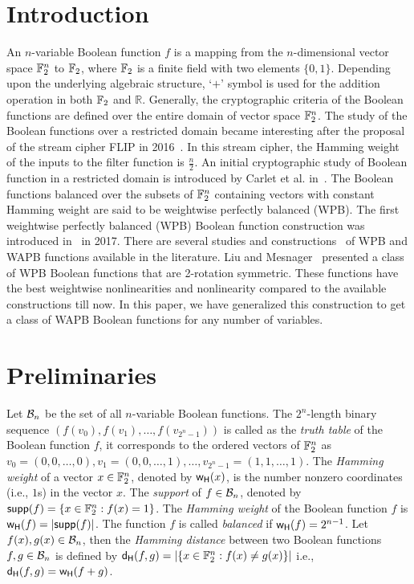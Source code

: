 \documentclass{llncs}
\begin{document}
\section{Introduction}
An $n$-variable Boolean function $f$ is a mapping from the $n$-dimensional vector space $\mathbb{F}_2^n$ to $\mathbb{F}_2$, where $\mathbb{F}_2$ is a finite field with two elements $\{0,1\}$. Depending upon the underlying algebraic structure, `$+$' symbol is used for the addition operation in both $\mathbb{F}_2$ and $\mathbb{R}$. 
Generally, the cryptographic criteria of the Boolean functions are defined over the entire domain of vector space $\mathbb{F}_2^n$. The study of the Boolean functions over a restricted domain became interesting after the proposal of the stream cipher FLIP in 2016~\cite{EC:MJSC16}. 
In this stream cipher, the Hamming weight of the inputs to the filter function is  $\frac{n}{2}$.  
An initial cryptographic study of Boolean function in a restricted domain is introduced by Carlet et al. in~\cite{TOSC:CarMeaRot17}.    
The Boolean functions balanced over the subsets of $\mathbb{F}_2^n$ containing vectors with constant Hamming weight are said to be weightwise perfectly balanced (WPB). The first weightwise perfectly balanced (WPB) Boolean function construction was introduced in~\cite{TOSC:CarMeaRot17} in 2017.  There are several studies and constructions~\cite{CC:TangLiu19,DCC:LiuMes19,DAM:LiSu20,CC:MesSu21,DAM:Su21,DAM:ZhuSu22,DAM:GinMea22,INDO:GinMea22,Latin:GinMea23,DAM:ZLCQZ23,AMC:DM24} of WPB and WAPB functions available in the literature.
Liu and Mesnager~\cite{DCC:LiuMes19} presented a class of WPB Boolean functions that are 2-rotation symmetric. These functions have the best weightwise nonlinearities and nonlinearity compared to the available constructions till now. In this paper, we have generalized this construction to get a class of WAPB Boolean functions for any number of variables.
\section{Preliminaries}
Let $\mathcal{B}_n$ be the set of all $n$-variable Boolean functions. 
The $2^n$-length binary sequence $(f(v_0), f(v_1), \ldots, f(v_{2^n-1}))$ is called as the {\em truth table} of the Boolean function $f$, it corresponds to the ordered vectors of $\mathbb{F}_2^n$ as $v_0 = (0,0,\ldots,0), v_1= (0,0,\ldots,1),\ldots, v_{2^n-1}=(1,1,\ldots,1)$. 
The {\em Hamming weight} of a vector $x \in \mathbb{F}_2^n$, denoted by $\mathsf{w_H}(x)$, is the number nonzero coordinates (i.e., $1$s) in the vector $x$. The {\em support} of $f \in \mathcal{B}_n$, denoted by $\mathsf{supp}(f)= \{x \in \mathbb{F}_2^n : f(x) = 1\}$. The {\em Hamming weight} of the Boolean function $f$ is $\mathsf{w_H}(f) = |\mathsf{supp}(f)|$. The function $f$ is called {\em balanced} if $\mathsf{w_H}(f)= 2^{n-1}$. Let $f(x), g(x) \in \mathcal{B}_n$, then the {\em Hamming distance} between two Boolean functions $f, g \in \mathcal{B}_n$ is defined by $\mathsf{d_H}(f,g) = |\{x \in \mathbb{F}_2^n : f(x) \neq g(x) \}|$  i.e., $\mathsf{d_H}(f,g) = \mathsf{w_H}(f + g)$.
\end{document}
